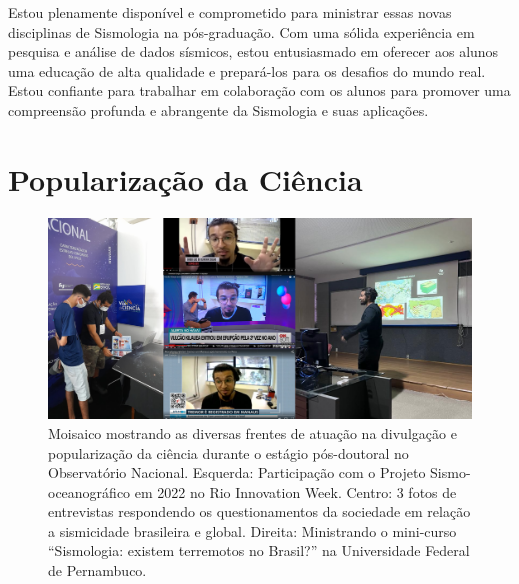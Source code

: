 \documentclass[10pt,a4paper,oneside]{book}
\newcommand{\HeroFigPad}{\vspace{-1cm}}
\begin{document}
Estou plenamente disponível e comprometido para ministrar essas novas disciplinas de Sismologia na pós-graduação. Com uma sólida experiência em pesquisa e análise de dados sísmicos, estou entusiasmado em oferecer aos alunos uma educação de alta qualidade e prepará-los para os desafios do mundo real. Estou confiante para trabalhar em colaboração com os alunos para promover uma compreensão profunda e abrangente da Sismologia e suas aplicações.



\chapter{Popularização da Ciência}
\label{cap_comunidade}

\bigskip

\begin{figure}[h]
  \HeroFigPad
  \begin{center}
    \includegraphics[width=\textwidth]{images/atuacao_divulga.png}
  \end{center}
  \caption{
    Moisaico mostrando as diversas frentes de atuação na divulgação e popularização da ciência durante o estágio pós-doutoral no Observatório Nacional. Esquerda: Participação com o Projeto Sismo-oceanográfico em 2022 no Rio Innovation Week. Centro: 3 fotos de entrevistas respondendo os questionamentos da sociedade em relação a sismicidade brasileira e global. Direita: Ministrando o mini-curso “Sismologia: existem terremotos no Brasil?” na Universidade Federal de Pernambuco.}
\end{figure}
\end{document}
